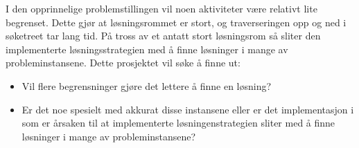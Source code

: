 I den opprinnelige problemstillingen vil noen aktiviteter være relativt lite begrenset. Dette gjør at løsningsrommet er stort, og traverseringen opp og ned i søketreet tar lang tid. På tross av et antatt stort løsningsrom så sliter den \ilog implementerte løsningsstrategien med å finne løsninger i mange av probleminstansene. Dette prosjektet vil søke å finne ut:

\begin{itemize}
\item Vil flere begrensninger gjøre det lettere å finne en løsning?
\item Er det noe spesielt med akkurat disse instansene eller er det implementasjon i \ilog som er årsaken til at \ilog implementerte løsningenstrategien sliter med å finne løsninger i mange av probleminstansene?
\end{itemize}